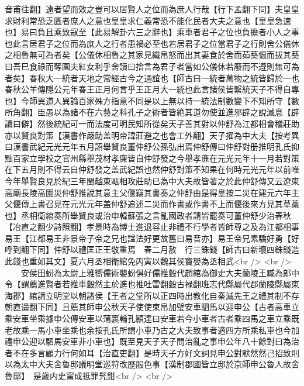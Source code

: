 音甫往翻】遠者望而效之豈可以居賢人之位而為庶人行哉【行下孟翻下同】夫皇皇求財利常恐乏匱者庶人之意也皇皇求仁義常恐不能化民者大夫之意也【皇皇急速也】易曰負且乘致寇至【此易解卦六三之辭也】乘車者君子之位也負擔者小人之事也此言居君子之位而為庶人之行者患禍必至也若居君子之位當君子之行則舍公儀休之相魯無可為者矣【公儀休相魯之其家見織帛怒而出其妻食於舍而茹葵愠而拔其葵曰吾巳食祿而奪園夫紅女利乎舍讀曰捨言為君子者當如公儀休若廢而不遵則無可為者矣】春秋大一統者天地之常經古今之通誼也【師古曰一統者萬物之統皆歸於一也春秋公羊傳隱公元年春王正月何言乎王正月大一統也此言諸侯皆繫統天子不得自專也】今師異道人異論百家殊方指意不同是以上無以持一統法制數變下不知所守【數所角翻】臣愚以為諸不在六藝之科孔子之術者皆絶其道勿使並進邪辟之說滅息【辟讀曰僻】然後統紀可一而法度可明民知所從矣天子善其對以仲舒為江都相會稽莊助亦以賢良對策【漢書作嚴助盖明帝諱莊避之也會工外翻】天子擢為中大夫【按考異曰漢書武紀元光元年五月詔舉賢良董仲舒公孫弘出焉仲舒傳曰仲舒對册推明孔氏抑黜百家立學校之官州縣舉茂材孝廉皆自仲舒發之今舉孝亷在元光元年十一月若對策在下五月則不得云自仲舒發之盖武紀誤也然仲舒對策不知果在何時元光元年以前唯今年舉賢良見於紀三年閩越東甌相攻莊助已為中大夫故皆著之於此仲舒傳又云遼東高廟長陵高園災仲舒推說其意主父偃竊其書奏之仲舒由是得辠按二災在建元六年主父偃傳上書召見在元光元年盖仲舒追述二災而作書或作書不上而偃後來方見其草藁也】丞相衛綰奏所舉賢良或治申韓蘇張之言亂國政者請皆罷奏可董仲舒少治春秋【冶直之翻少詩照翻】孝景時為博士進退容止非禮不行學者皆師尊之及為江都相事易王【江都易王非景帝子帝之兄也諡法好更故舊曰易音亦】易王帝兄素驕好勇【好呼到翻下同】仲舒以禮匡正王敬重焉　春二月赦　行三銖錢【師古曰新壞四銖錢造此錢也重如其文】夏六月丞相衛綰免丙寅以魏其侯竇嬰為丞相武<br />
<br />
　　安侯田蚡為太尉上雅嚮儒術嬰蚡俱好儒推轂代趙綰為御史大夫蘭陵王臧為郎中令【謂薦進賢者若推車轂然主於進也推吐雷翻轂古禄翻班志代縣屬代郡蘭陵縣屬東海郡】綰請立明堂以朝諸侯【王者之堂所以正四時出教化自秦滅先王之禮其制不存朝直遥翻下同】且薦其師申公秋天子使使束帛加璧安車駟馬以迎申公【古者高車立乘安車坐乘據申公傳安車以蒲裹輪孔頴達曰安車若今小車者古者乘四馬之車立乘既老故乘一馬小車坐乘也余按孔氏所謂小車乃古之大夫致事者適四方所乘私車也今加禮申公迎以駟馬安車非小車也】既至見天子天子問治亂之事申公年八十餘對曰為治者不在多言顧力行何如耳【治直吏翻】是時天子方好文詞見申公對默然然己招致則以為太中大夫舍魯邸議明堂巡狩改歷服色事【漢制郡國皆立邸於京師申公魯人故舍魯邸】　是歲内史甯成抵罪髠鉗<br />
<br />
